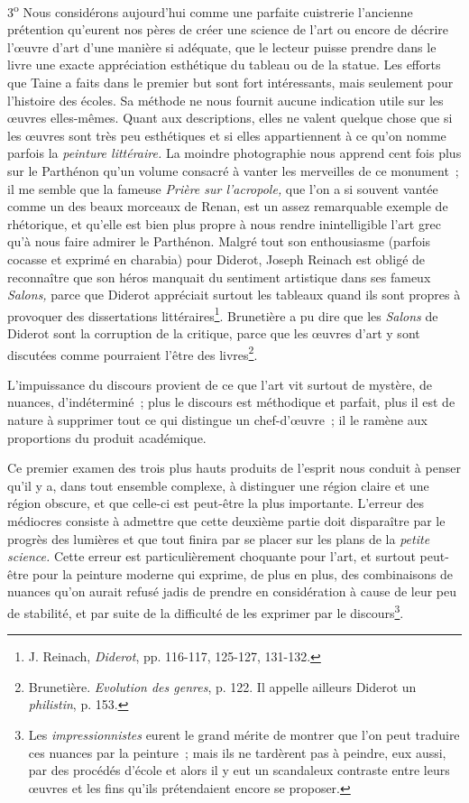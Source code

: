 \documentclass[french,twoside]{book} %
\begin{document}
3\textsuperscript{o} Nous considérons aujourd’hui comme une parfaite cuistrerie l’ancienne prétention qu’eurent nos pères de créer une science de l’art ou encore de décrire l’œuvre d’art d’une manière si adéquate, que le lecteur puisse prendre dans le livre une exacte appréciation esthétique du tableau ou de la statue. Les efforts que Taine a faits dans le premier but sont fort intéressants, mais seulement pour l’histoire des écoles. Sa méthode ne nous fournit aucune indication utile sur les œuvres elles-mêmes. Quant aux descriptions, elles ne valent quelque chose que si les œuvres sont très peu esthétiques et si elles appartiennent à ce qu’on nomme parfois la \emph{peinture littéraire.} La moindre photographie nous apprend cent fois plus sur le Parthénon qu’un volume consacré à vanter les merveilles de ce monument ; il me semble que la fameuse \emph{Prière sur l’acropole,} que l’on a si souvent vantée comme un des beaux morceaux de Renan, est un assez remarquable exemple de rhétorique, et qu’elle est bien plus propre à nous rendre inintelligible l’art grec qu’à nous faire admirer le Parthénon. Malgré tout son enthousiasme (parfois cocasse et exprimé en charabia) pour Diderot, Joseph Reinach est obligé de reconnaître  que son héros manquait du sentiment artistique dans ses fameux \emph{Salons,} parce que Diderot appréciait surtout les tableaux quand ils sont propres à provoquer des dissertations littéraires\footnote{ \noindent J. Reinach, \emph{Diderot}, pp. 116-117, 125-127, 131-132.
 }. Brunetière a pu dire que les \emph{Salons }de Diderot sont la corruption de la critique, parce que les œuvres d’art y sont discutées comme pourraient l’être des livres\footnote{ \noindent Brunetière. \emph{Evolution des genres}, p. 122. Il appelle ailleurs Diderot un \emph{philistin}, p. 153.
 }.\par
L’impuissance du discours provient de ce que l’art vit surtout de mystère, de nuances, d’indéterminé ; plus le discours est méthodique et parfait, plus il est de nature à supprimer tout ce qui distingue un chef-d’œuvre ; il le ramène aux proportions du produit académique.\par
Ce premier examen des trois plus hauts produits de l’esprit nous conduit à penser qu’il y a, dans tout ensemble complexe, à distinguer une région claire et une région obscure, et que celle-ci est peut-être la plus importante. L’erreur des médiocres consiste à admettre que cette deuxième partie doit disparaître par le progrès des lumières et que tout finira par se placer sur les plans de la \emph{petite science.} Cette erreur est particulièrement choquante pour l’art, et surtout peut-être pour la peinture moderne qui exprime, de plus en plus, des combinaisons de nuances qu’on aurait refusé jadis de prendre en considération à cause de leur peu de stabilité, et par suite de la difficulté de les exprimer par le discours\footnote{ \noindent Les \emph{impressionnistes} eurent le grand mérite de montrer que l’on peut traduire ces nuances par la peinture ; mais ils ne tardèrent pas à peindre, eux aussi, par des procédés d’école et alors il y eut un scandaleux contraste entre leurs œuvres et les fins qu’ils prétendaient encore se proposer.
 }.\par
 
\end{document}
